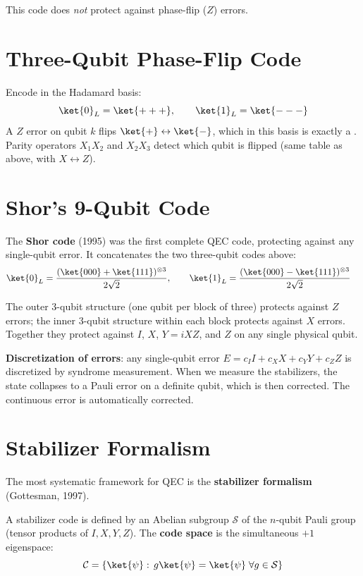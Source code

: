 \documentclass[oneside]{academica}
\begin{document}
\begin{note}
  This code does \emph{not} protect against phase-flip ($Z$) errors.
\end{note}

\section{Three-Qubit Phase-Flip Code}

Encode in the Hadamard basis:
\begin{equation*}
  \ket{0}_L=\ket{+++},\qquad\ket{1}_L=\ket{---}
\end{equation*}
A $Z$ error on qubit $k$ flips $\ket{+}\leftrightarrow\ket{-}$, which in this basis is exactly a .
Parity operators $X_1X_2$ and $X_2X_3$ detect which qubit is flipped (same table as above, with $X\leftrightarrow Z$).

\section{Shor's 9-Qubit Code}

The \textbf{Shor code} (1995) was the first complete QEC code, protecting against any single-qubit error.
It concatenates the two three-qubit codes above:
\begin{align*}
  \ket{0}_L&=\frac{(\ket{000}+\ket{111})^{\otimes3}}{2\sqrt{2}},\qquad
  \ket{1}_L=\frac{(\ket{000}-\ket{111})^{\otimes3}}{2\sqrt{2}}
\end{align*}

The outer 3-qubit structure (one qubit per block of three) protects against $Z$ errors; the inner 3-qubit structure within each block protects against $X$ errors.
Together they protect against $I$, $X$, $Y=iXZ$, and $Z$ on any single physical qubit.

\textbf{Discretization of errors}: any single-qubit error $E=c_I I+c_X X+c_Y Y+c_Z Z$ is discretized by syndrome measurement.
When we measure the stabilizers, the state collapses to a Pauli error on a definite qubit, which is then corrected.
The continuous error is automatically corrected.

\section{Stabilizer Formalism}

The most systematic framework for QEC is the \textbf{stabilizer formalism} (Gottesman, 1997).

\begin{definition*}
  A stabilizer code is defined by an Abelian subgroup $\mathcal{S}$ of the $n$-qubit Pauli group (tensor products of $I,X,Y,Z$).
  The \textbf{code space} is the simultaneous $+1$ eigenspace:
  \begin{equation*}
    \mathcal{C}=\{\ket{\psi}:\,g\ket{\psi}=\ket{\psi}\;\forall g\in\mathcal{S}\}
  \end{equation*}
\end{definition*}
\end{document}
